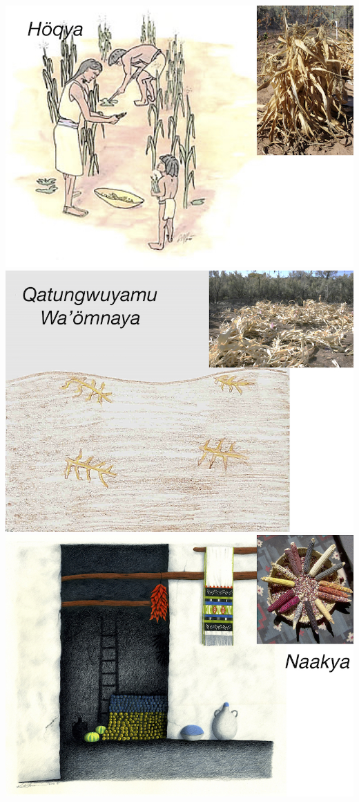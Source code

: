 \documentclass[12pt,]{article}
\begin{document}
\includegraphics{./images/hopi_growth/7_hoqya.jpg}
\includegraphics{./images/hopi_growth/8_qatungwuyamu_waomnaya.jpg}
\includegraphics{./images/hopi_growth/9_naakya.jpg}
\end{document}
